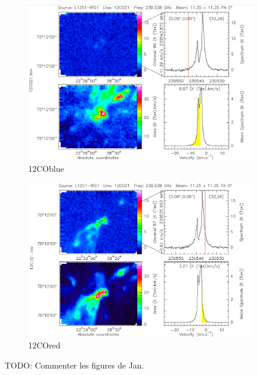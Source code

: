 \documentclass[a4paper,10pt,french]{article}
\begin{document}
\begin{figure}[ht]
    \centering
    \includegraphics[width=0.9\textwidth]{12COblue.png}
    \caption{12COblue}
\end{figure}

\begin{figure}[ht]
    \centering
    \includegraphics[width=0.9\textwidth]{12COred.png}
    \caption{12COred}
\end{figure}

TODO: Commenter les figures de Jan.
\end{document}
